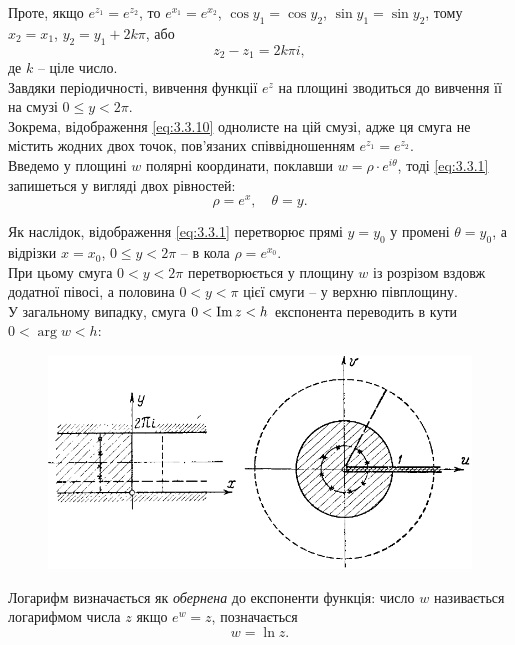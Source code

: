 Проте, якщо $e^{z_1} = e^{z_2}$, то $e^{x_1} = e^{x_2}$, $\cos y_1 = \cos y_2$, $\sin y_1 = \sin y_2$, тому $x_2 = x_1$, $y_2 = y_1 + 2 k \pi$, або
\begin{equation}
	\label{eq:3.3.10}
	z_2 - z_1 = 2 k \pi i,
\end{equation}
де $k$ -- ціле число. \\

Завдяки періодичності, вивчення функції $e^z$ на площині зводиться до вивчення її на смузі $0 \le y < 2 \pi$. \\

Зокрема, відображення \eqref{eq:3.3.10} однолисте на цій смузі, адже ця смуга не містить жодних двох точок, пов'язаних співвідношенням $e^{z_1} = e^{z_2}$. \\

Введемо у площині $w$ полярні координати, поклавши $w = \rho \cdot e^{i \theta}$, тоді \eqref{eq:3.3.1} запишеться у вигляді двох рівностей:
\begin{equation}
	\label{eq:3.3.11}
	\rho = e^x, \quad \theta = y.
\end{equation}

Як наслідок, відображення \eqref{eq:3.3.1} перетворює прямі $y = y_0$ у промені $\theta = y_0$, а відрізки $x = x_0$, $0 \le y < 2 \pi$ -- в кола $\rho = e^{x_0}$. \\

При цьому смуга $0 < y < 2 \pi$ перетворюється у площину $w$ із розрізом вздовж додатної півосі, а половина $0 < y < \pi$ цієї смуги -- у верхню півплощину. \\

У загальному випадку, смуга $0 < \operatorname{Im} z < h$ експонента переводить в кути $0 < \arg w < h$:
\begin{figure}[H]
	\centering
	\includegraphics[width=.8\linewidth]{mal-13.png}
\end{figure}

Логарифм визначається як \textit{обернена} до експоненти функція: число $w$ називається логарифмом числа $z$ якщо $e^w = z$, позначається
\begin{equation}
	\label{eq:3.3.12}
	w = \ln z.
\end{equation}

